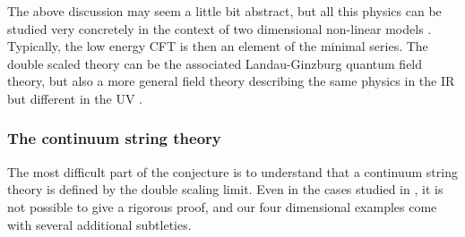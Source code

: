 \documentclass[a4paper,12pt]{article}
\begin{document}
{The above discussion may seem a little bit abstract, but all this
physics can be studied very concretely in the context of
two dimensional non-linear \myHighlight{$\sigma$}\coordHE{} models \cite{fer3}.
Typically, the low energy CFT is then an element of the minimal
series. The double scaled theory can be the associated
Landau-Ginzburg quantum field theory, but also a more general field
theory describing the same physics in the IR but different in the UV
\cite{fer3}.
%
\subsubsection{The continuum string theory}
%
The most difficult part of the conjecture is to understand that
a continuum string theory is defined by the 
double scaling limit. Even in the \coordHE{} cases studied in
\cite{BK,review}, it is not possible to give a rigorous proof, and our four 
dimensional examples come with several additional subtleties. 

}
\end{document}

